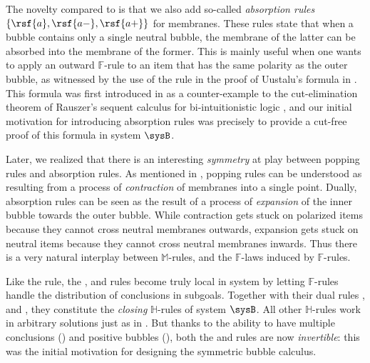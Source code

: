\begin{description}
  The novelty compared to  is that we also add so-called
  \emph{absorption rules} $\{\rsf{a},\rsf{a{-}},\rsf{a{+}}\}$ for membranes.
  These rules state that when a bubble contains only a single neutral bubble,
  the membrane of the latter can be absorbed into the membrane of the former.
  This is mainly useful when one wants to apply an outward $\mathbb{F}$-rule to
  an item that has the same polarity as the outer bubble, as witnessed by the
  use of the  rule in the proof of Uustalu's formula in
  . This formula was first introduced in
   as a counter-example to the cut-elimination
  theorem of Rauszer's sequent calculus for bi-intuitionistic logic
  , and our initial motivation for
  introducing absorption rules was precisely to provide a cut-free proof of this
  formula in system $\sysB$.

  Later, we realized that there is an interesting \emph{symmetry} at play
  between popping rules and absorption rules. As mentioned in
  , popping rules can be understood as resulting from a
  process of \emph{contraction} of membranes into a single point. Dually,
  absorption rules can be seen as the result of a process of \emph{expansion} of
  the inner bubble towards the outer bubble. While contraction gets stuck on
  polarized items because they cannot cross neutral membranes outwards,
  expansion gets stuck on neutral items because they cannot cross neutral
  membranes inwards. Thus there is a very natural interplay between
  $\mathbb{M}$-rules, and the $\mathbb{F}$-laws induced by $\mathbb{F}$-rules.

  \item[\textbf{\heating}] 
  Like the  rule, the \rsf{\bot{-}}, \rsf{\lor{-}} and
  \rsf{{\limp}{-}} rules become truly local in system  by letting
  $\mathbb{F}$-rules handle the distribution of conclusions in subgoals.
  Together with their dual rules \rsf{\top{+}}, \rsf{\land{+}} and
  \rsf{{\limp}{+}}, they constitute the \emph{closing} $\mathbb{H}$-rules of
  system $\sysB$. All other $\mathbb{H}$-rules work in arbitrary solutions just
  as in . But thanks to the ability to have multiple conclusions
  () and positive bubbles (), both the
  \rsf{\lor{+}} and \rsf{{\limp}{+}} rules are now \emph{invertible}: this was
  the initial motivation for designing the symmetric bubble calculus.
\end{description}